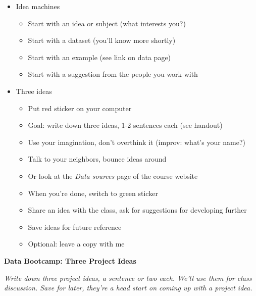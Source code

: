 \begin{itemize}
\item Idea machines
\begin{itemize}
\item Start with an idea or subject (what interests you?)
\item Start with a dataset (you'll know more shortly)
\item Start with an example (see link on data page)
\item Start with a suggestion from the people you work with
\end{itemize}

\item Three ideas
\begin{itemize}
\item Put red sticker on your computer
\item Goal:  write down three ideas, 1-2 sentences each (see handout)
\item Use your imagination, don't overthink it (improv: what's your name?)
\item Talk to your neighbors, bounce ideas around
\item Or look at the {\it Data sources\/} page of the course website
\item When you're done, switch to green sticker
\item Share an idea with the class, ask for suggestions for developing further
\item Save ideas for future reference
\item Optional:  leave a copy with me
\end{itemize}
\end{itemize}

\newpage

\bigskip
\centerline{\Large \bf Data Bootcamp: Three Project Ideas}

\bigskip
{\it Write down three project ideas, a sentence or two each. We'll use them for class discussion.
Save for later, they're a head start on coming up with a project idea.}


%



